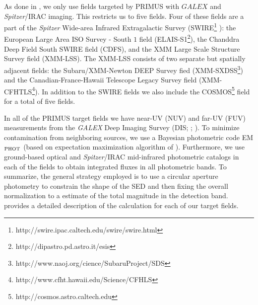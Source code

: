 \documentclass{emulateapj}
\begin{document}
As done in \cite{Moustakas:2013aa}, we only use fields targeted by PRIMUS with $GALEX$ and {\em Spitzer}/IRAC imaging.
This restricts us to five fields.
Four of these fields are a part of the {\em Spitzer} Wide-area Infrared Extragalactic Survey (SWIRE\footnote{http://swire.ipac.caltech.edu/swire/swire.html} ): 
the European Large Area ISO Survey - South $1$ field (ELAIS-S1\footnote{http://dipastro.pd.astro.it/esis}), the Chanddra Deep Field South SWIRE field (CDFS), 
and the XMM Large Scale Structure Survey field (XMM-LSS).
The XMM-LSS consists of two separate but spatially adjacent fields: the Subaru/XMM-Newton DEEP Survey fied (XMM-SXDSS\footnote{http://www.naoj.org/cience/SubaruProject/SDS})
and the Canadian-France-Hawaii Telescope Legacy Survey field (XMM-CFHTLS\footnote{http://www.cfht.hawaii.edu/Science/CFHLS}).
In addition to the SWIRE fields we also include the COSMOS\footnote{http://cosmos.astro.caltech.edu} field for a total of five fields. 

In all of the PRIMUS target fields we have near-UV (NUV) and far-UV (FUV) measurements from the {\em GALEX} Deep Imaging Survey (DIS; \cite{Martin:2005aa}; \cite{Morrissey:2005aa}). 
To minimize contamination from neighboring sources, we use a Bayesian photometric code EM$_{\rm{PHOT}}$ (based on expectation maximization algorithm of \cite{Guillaume:2006aa}). 
Furthermore, we use ground-based optical and {\em Spitzer}/IRAC mid-infrared photometric catalogs in each of the fields to obtain integrated fluxes in all 
photometric bands.
To summarize, the general strategy employed is to use a circular aperture photometry to constrain the shape of the SED and then fixing the overall normalization to 
a estimate of the total magnitude in the detection band. 
\cite{Moustakas:2013aa} provides a detailed description of the calculation for each of our target fields.  
\end{document}
